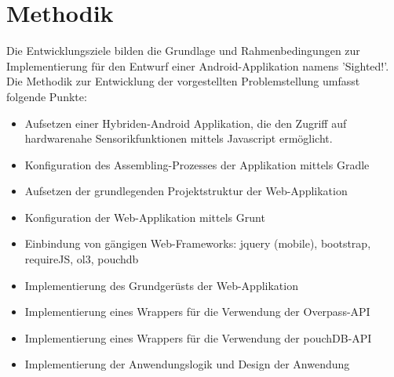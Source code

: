 \section{Methodik}
\label{sec:methodik}



Die Entwicklungsziele bilden die Grundlage und Rahmenbedingungen zur Implementierung für den Entwurf einer Android-Applikation namens 'Sighted!'. Die Methodik zur Entwicklung der vorgestellten Problemstellung umfasst folgende Punkte:

\begin{itemize}
  \setlength{\itemsep}{1pt}
  \setlength{\parskip}{0pt}
  \setlength{\parsep}{0pt}
  
  \item Aufsetzen einer Hybriden-Android Applikation, die den Zugriff auf hardwarenahe Sensorikfunktionen mittels Javascript ermöglicht.
  \item Konfiguration des Assembling-Prozesses der Applikation mittels Gradle
  \item Aufsetzen der grundlegenden Projektstruktur der Web-Applikation
  \item Konfiguration der Web-Applikation mittels Grunt
  \item Einbindung von gängigen Web-Frameworks: jquery (mobile), bootstrap, requireJS, ol3, pouchdb
  \item Implementierung des Grundgerüsts der Web-Applikation
  \item Implementierung eines Wrappers für die Verwendung der Overpass-API
  \item Implementierung eines Wrappers für die Verwendung der pouchDB-API
  \item Implementierung der Anwendungslogik und Design der Anwendung 

\end{itemize}
